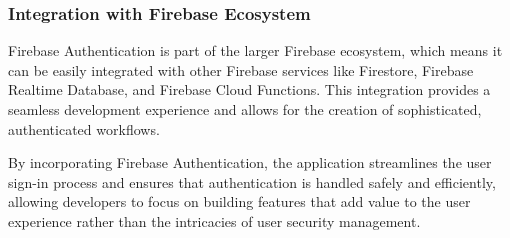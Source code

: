 \subsubsection{Integration with Firebase Ecosystem}
Firebase Authentication is part of the larger Firebase ecosystem, which means it can be easily integrated with other Firebase services like Firestore, Firebase Realtime Database, and Firebase Cloud Functions. This integration provides a seamless development experience and allows for the creation of sophisticated, authenticated workflows.

By incorporating Firebase Authentication, the application streamlines the user sign-in process and ensures that authentication is handled safely and efficiently, allowing developers to focus on building features that add value to the user experience rather than the intricacies of user security management.
